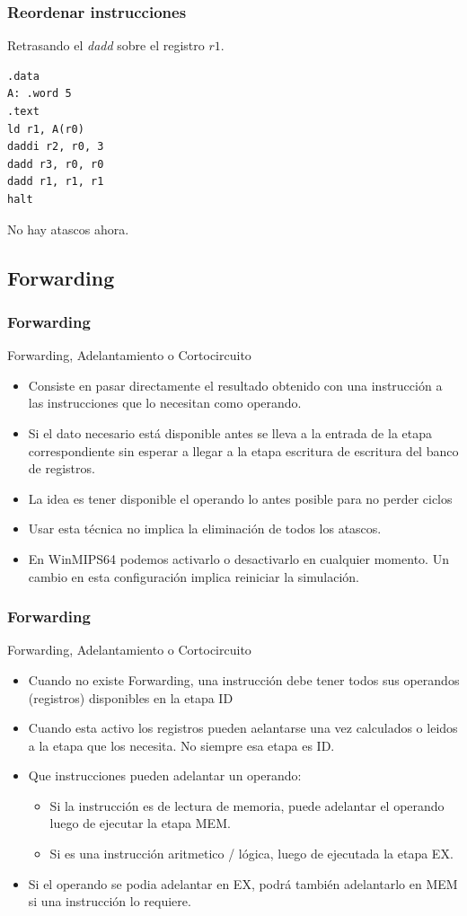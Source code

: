 \documentclass{beamer}
\begin{document}
\begin{frame}[fragile]
\frametitle{Reordenar instrucciones}
Retrasando el \emph{dadd} sobre el registro $r1$.
\begin{block}{}
\begin{lstlisting}[language=WinMIPS64,basicstyle=\ttfamily,keywordstyle=\color{blue}]
.data
A: .word 5
.text
ld r1, A(r0)
daddi r2, r0, 3
dadd r3, r0, r0
dadd r1, r1, r1
halt
\end{lstlisting}
\end{block}
No hay atascos ahora.
\end{frame}



\subsection{Forwarding}

\begin{frame}[fragile]
\frametitle{Forwarding}
Forwarding, Adelantamiento o Cortocircuito
\begin{itemize}
\item Consiste en pasar directamente el resultado obtenido con una instrucción a las instrucciones que lo necesitan como operando.
\item Si el dato necesario está disponible antes se lleva a la entrada de la etapa correspondiente sin esperar a llegar a la etapa escritura de escritura del banco de registros.
\item La idea es tener disponible el operando lo antes posible para no perder ciclos
\item Usar esta técnica no implica la eliminación de todos los atascos.
\item En WinMIPS64 podemos activarlo o desactivarlo en cualquier momento. Un cambio en esta configuración implica reiniciar la simulación.
\end{itemize}
\end{frame}


\begin{frame}[fragile]
\frametitle{Forwarding}
Forwarding, Adelantamiento o Cortocircuito
\begin{itemize}
\item Cuando no existe Forwarding, una instrucción debe tener todos sus operandos (registros) disponibles en la etapa ID
\item Cuando esta activo los registros pueden aelantarse una vez calculados o leidos a la etapa que los necesita. No siempre esa etapa es ID.
\item Que instrucciones pueden adelantar un operando:
\begin{itemize}
\item Si la instrucción es de lectura de memoria, puede adelantar el operando luego de ejecutar la etapa MEM.
\item Si es una instrucción aritmetico / lógica, luego de ejecutada la etapa EX.
\end{itemize}
\item Si el operando se podia adelantar en EX, podrá también adelantarlo en MEM si una instrucción lo requiere.
\end{itemize}
\end{frame}
\end{document}
